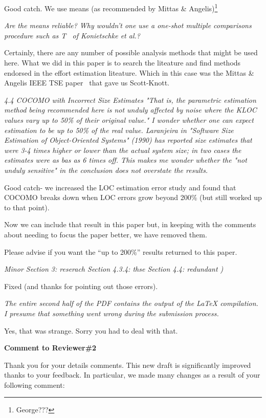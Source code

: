 \documentclass[smallcondesed]{svjour3}
\begin{document}
Good catch. We use means (as recommended by Mittas     \& Angelis)\footnote{George???}

{\em      Are the means reliable? Why wouldn't one use a one-shot multiple comparisons procedure such as T~ of Konietschke et al.?}

Certainly, there are any number of possible analysis methods that might be used here.
What we did in this paper is to search the liteature and find
methods endorsed in the effort estimation liteature. Which in this case was
the Mittas \& Angelis 
IEEE TSE paper~\cite{mittas13} that gave us Scott-Knott.

{\em 4.4 COCOMO with Incorrect Size Estimates "That
  is, the parametric estimation method being
  recommended here is not unduly affected by noise
  where the KLOC values vary up to 50\% of their
  original value." I wonder whether one can expect
  estimation to be up to 50\% of the real
  value. Laranjeira in "Software Size Estimation of
  Object-Oriented Systems" (1990) has reported size
  estimates that were 3-4 times higher or lower than
  the actual system size; in two cases the estimates
  were as bas as 6 times off. This makes me wonder
  whether the "not unduly sensitive" in the
  conclusion does not overstate the results.}

Good catch- we increased the LOC estimation error study and found that
COCOMO breaks down when LOC errors grow beyond 200\% (but still worked up
to that point).

Now we can include that result in this paper but, in keeping with the comments
about needing to focus the paper better, we have removed them.

Please advise if you want the ``up to 200\%'' results returned to this paper.

{\em Minor\newline
Section 3: reserach\newline
Section 4.3.4: thse\newline
Section 4.4: redundant )}

Fixed (and thanks for pointing out those errors).


{\em The entire second half of the PDF contains the output of the LaTeX compilation. I presume that something went wrong during the submission process.}

Yes, that was strange. Sorry you had to deal with that.

\noindent
{\bf Comment to Reviewer\#2}

\noindent
Thank you for your details comments.  This new draft
is significantly improved thanks to your  feedback. In particular,
we made many changes as a result of your following comment:
\end{document}
